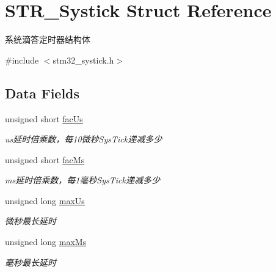 \hypertarget{struct_s_t_r___systick}{\section{\-S\-T\-R\-\_\-\-Systick \-Struct \-Reference}
\label{struct_s_t_r___systick}
}


系统滴答定时器结构体  




{\ttfamily \#include $<$stm32\-\_\-systick.\-h$>$}

\subsection*{\-Data \-Fields}
\begin{DoxyCompactItemize}
\item 
\hypertarget{struct_s_t_r___systick_aaf84cd74aef4f30d13b230f924762850}{unsigned short \hyperlink{struct_s_t_r___systick_aaf84cd74aef4f30d13b230f924762850}{fac\-Us}}\label{struct_s_t_r___systick_aaf84cd74aef4f30d13b230f924762850}

\begin{DoxyCompactList}\small\item\em us延时倍乘数，每10微秒\-Sys\-Tick递减多少 \end{DoxyCompactList}\item 
\hypertarget{struct_s_t_r___systick_a14ff2edc3bac64beab647de08f0833f1}{unsigned short \hyperlink{struct_s_t_r___systick_a14ff2edc3bac64beab647de08f0833f1}{fac\-Ms}}\label{struct_s_t_r___systick_a14ff2edc3bac64beab647de08f0833f1}

\begin{DoxyCompactList}\small\item\em ms延时倍乘数，每1毫秒\-Sys\-Tick递减多少 \end{DoxyCompactList}\item 
\hypertarget{struct_s_t_r___systick_ab8f7f05e73a7909a8b0d5fc1045dc284}{unsigned long \hyperlink{struct_s_t_r___systick_ab8f7f05e73a7909a8b0d5fc1045dc284}{max\-Us}}\label{struct_s_t_r___systick_ab8f7f05e73a7909a8b0d5fc1045dc284}

\begin{DoxyCompactList}\small\item\em 微秒最长延时 \end{DoxyCompactList}\item 
\hypertarget{struct_s_t_r___systick_aef6cae79491b3f097febf0f26e07e36e}{unsigned long \hyperlink{struct_s_t_r___systick_aef6cae79491b3f097febf0f26e07e36e}{max\-Ms}}\label{struct_s_t_r___systick_aef6cae79491b3f097febf0f26e07e36e}

\begin{DoxyCompactList}\small\item\em 毫秒最长延时 \end{DoxyCompactList}\end{DoxyCompactItemize}


